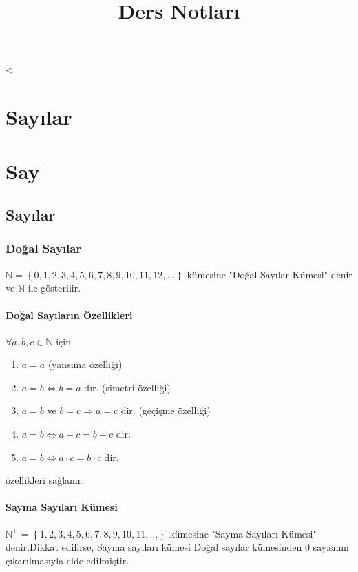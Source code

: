 \textless\documentclass[a4paper,10pt]{book}
\begin{document}
\def\xstrut{\vphantom{\frac{(A)^1}{(B)^1}}}
\title{Ders Notları}
\date{}
\def\chaptername{Bölüm}
\theoremstyle{italik}
\newtheorem{ornek}{Örnek}[chapter]
\newtheorem*{cozum}{Çözüm}
\newtheorem*{tanim}{Tanım}[chapter]
\maketitle
\chapter{Sayılar}
\chapter{Say}

\section{Sayılar}
\subsection{Doğal Sayılar}
$\mathbb{N}=\left\{0,1,2,3,4,5,6,7,8,9,10,11,12,\ldots\right\}$ kümesine "Doğal Sayılar Kümesi" denir ve $\mathbb{N}$ ile
gösterilir.
\subsubsection{Doğal Sayıların Özellikleri}
$\forall a,b,c \in \mathbb{N}$ için
\begin{enumerate}
	\item $a=a$ (yansıma özelliği)
	\item $a=b \Leftrightarrow b=a$ dır. (simetri özelliği)
	\item $a=b$ ve $b=c \Rightarrow a=c$ dir. (geçişme özelliği)
	\item $a=b \Leftrightarrow a+c=b+c$ dir.
	\item $a=b \Leftrightarrow a \cdot c=b \cdot c$ dir.
\end{enumerate}
özellikleri sağlanır.

\subsubsection{Sayma Sayıları Kümesi}
$\mathbb{N}^+=\left\{1,2,3,4,5,6,7,8,9,10,11,\ldots\right\}$ kümesine "Sayma Sayıları Kümesi" denir.Dikkat edilirse,
Sayma sayıları kümesi Doğal sayılar kümesinden $0$ sayısının çıkarılmasıyla elde edilmiştir.
\end{document}
